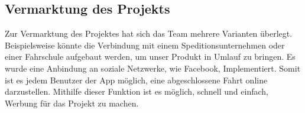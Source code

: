 \subsection{Vermarktung des Projekts}

Zur Vermarktung des Projektes hat sich das Team mehrere Varianten überlegt.
\nextline
Beispielsweise könnte die Verbindung mit einem Speditionsunternehmen oder einer Fahrschule aufgebaut werden, um unser Produkt in Umlauf zu bringen.
\nextline
Es wurde eine Anbindung an soziale Netzwerke, wie Facebook, Implementiert. Somit ist es jedem Benutzer der App möglich, eine abgeschlossene Fahrt online darzustellen. Mithilfe dieser Funktion ist es möglich, schnell und einfach, Werbung für das Projekt zu machen.


\clearpage %